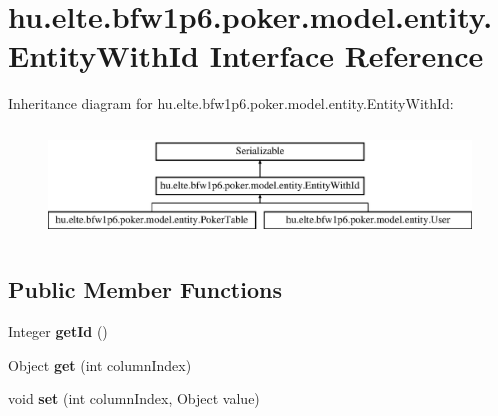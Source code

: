\hypertarget{interfacehu_1_1elte_1_1bfw1p6_1_1poker_1_1model_1_1entity_1_1_entity_with_id}{}\section{hu.\+elte.\+bfw1p6.\+poker.\+model.\+entity.\+Entity\+With\+Id Interface Reference}
\label{interfacehu_1_1elte_1_1bfw1p6_1_1poker_1_1model_1_1entity_1_1_entity_with_id}
Inheritance diagram for hu.\+elte.\+bfw1p6.\+poker.\+model.\+entity.\+Entity\+With\+Id\+:\begin{figure}[H]
\begin{center}
\leavevmode
\includegraphics[height=3.000000cm]{interfacehu_1_1elte_1_1bfw1p6_1_1poker_1_1model_1_1entity_1_1_entity_with_id}
\end{center}
\end{figure}
\subsection*{Public Member Functions}
\begin{DoxyCompactItemize}
\item 
\hypertarget{interfacehu_1_1elte_1_1bfw1p6_1_1poker_1_1model_1_1entity_1_1_entity_with_id_a2c7ac5dbd6384c32c2062f7012c27375}{}Integer {\bfseries get\+Id} ()\label{interfacehu_1_1elte_1_1bfw1p6_1_1poker_1_1model_1_1entity_1_1_entity_with_id_a2c7ac5dbd6384c32c2062f7012c27375}

\item 
\hypertarget{interfacehu_1_1elte_1_1bfw1p6_1_1poker_1_1model_1_1entity_1_1_entity_with_id_a8fbc35ec1d1d759ca17958a93053ee3e}{}Object {\bfseries get} (int column\+Index)\label{interfacehu_1_1elte_1_1bfw1p6_1_1poker_1_1model_1_1entity_1_1_entity_with_id_a8fbc35ec1d1d759ca17958a93053ee3e}

\item 
\hypertarget{interfacehu_1_1elte_1_1bfw1p6_1_1poker_1_1model_1_1entity_1_1_entity_with_id_a3d095077149b056d5de29b705f2acc90}{}void {\bfseries set} (int column\+Index, Object value)\label{interfacehu_1_1elte_1_1bfw1p6_1_1poker_1_1model_1_1entity_1_1_entity_with_id_a3d095077149b056d5de29b705f2acc90}

\end{DoxyCompactItemize}


